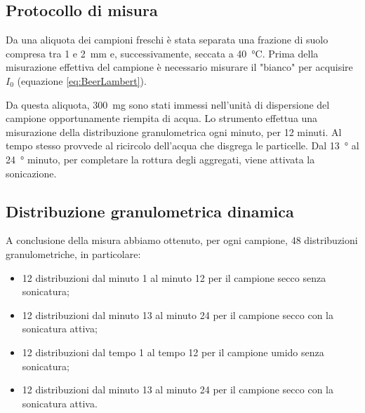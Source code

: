 \documentclass[11pt, a4paper, openright, titlepage, final, language = italian]{book}
\begin{document}
\subsection{Protocollo di misura}
Da una aliquota dei campioni freschi \`e stata separata una
frazione di suolo compresa tra 1 e \SI{2}{\milli\meter} e,
successivamente, seccata a \SI{40}{\celsius}.  Prima della misurazione
effettiva del campione \`e necessario misurare il "bianco" per
acquisire $I_0$ (equazione \ref{eq:BeerLambert}). 

Da questa aliquota, \SI{300}{\mg} sono stati immessi
nell'unit\`a di dispersione del campione opportunamente riempita di
acqua.  Lo strumento effettua una misurazione della distribuzione
granulometrica ogni minuto, per 12 minuti. Al tempo stesso provvede al
ricircolo dell'acqua che disgrega le particelle.  Dal
\SI{13}{\degree} al \SI{24}{\degree} minuto, per completare la rottura
degli aggregati, viene attivata la sonicazione.

\subsection{Distribuzione granulometrica dinamica}
A conclusione della misura abbiamo ottenuto, per ogni campione, 48
distribuzioni granulometriche, in particolare:
\begin{itemize}
\item 12 distribuzioni dal minuto 1 al minuto 12 per il campione secco
  senza sonicatura;
\item 12 distribuzioni dal minuto 13 al minuto 24 per il campione
  secco con la sonicatura attiva;
\item 12 distribuzioni dal tempo 1 al tempo 12 per il campione umido
  senza sonicatura;
\item 12 distribuzioni dal minuto 13 al minuto 24 per il campione
  secco con la sonicatura attiva.
\end{itemize}
\end{document}
